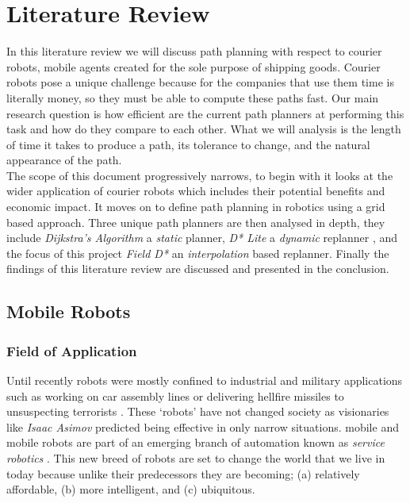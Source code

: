 \chapter{Literature Review}


\noindent
In this literature review we will discuss path planning with respect to courier robots, mobile agents created for the sole purpose of shipping goods. Courier robots pose a unique challenge because for the companies that use them time is literally money, so they must be able to compute these paths fast. Our main research question is how efficient are the current path planners at performing this task and how do they compare to each other. What we will analysis is the length of time it takes to produce a path, its tolerance to change, and the natural appearance of the path.\\

\noindent
The scope of this document progressively narrows, to begin with it looks at the wider application of courier robots which includes their potential benefits and economic impact. It moves on to define path planning in robotics using a grid based approach. Three unique path planners are then analysed in depth, they include \textit{Dijkstra's Algorithm} \cite{DIJKSTRA} a \textit{static} planner, \textit{D* Lite} a \textit{dynamic} replanner \cite{D*LITE}, and the focus of this project \textit{Field D*} an \textit{interpolation} based replanner. Finally the findings of this literature review are discussed and presented in the conclusion.

\newpage


\section{Mobile Robots}

\subsection{Field of Application}
\noindent
Until recently robots were mostly confined to industrial and military applications such as working on car assembly lines or delivering hellfire missiles to unsuspecting terrorists \cite{DRONE}. These `robots' have not changed society as visionaries like \textit{Isaac Asimov} predicted being effective in only narrow situations. mobile and mobile robots are part of an emerging branch of automation known as \textit{service robotics} \cite{SERVICE}. This new breed of robots are set to change the world that we live in today because unlike their predecessors they are becoming; (a) relatively affordable, (b) more intelligent, and (c) ubiquitous.\\

